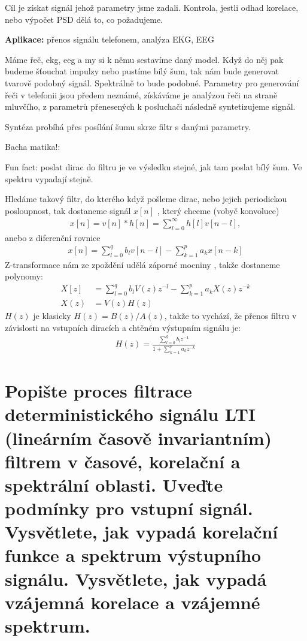 \documentclass[a4paper,12pt]{article}   %
\newcommand{\mt}[1]{$#1$}
\begin{document}
Cíl je získat signál jehož parametry jsme zadali. Kontrola, jestli odhad korelace, nebo výpočet PSD dělá to, co požadujeme.

\textbf{Aplikace:} přenos signálu telefonem, analýza EKG, EEG

Máme řeč, ekg, eeg a my si k němu sestavíme daný model. Když do něj pak budeme šťouchat impulzy nebo pustíme bílý šum, tak nám bude generovat tvarově podobný signál. Spektrálně to bude podobné. Parametry pro generování řeči v telefonii jsou předem neznámé, získáváme je analýzou řeči na straně mluvčího, z parametrů přenesených k posluchači následně syntetizujeme signál. 

Syntéza probíhá přes posílání šumu skrze filtr s danými parametry. 

Bacha matika!:

Fun fact: poslat dirac do filtru je ve výsledku stejné, jak tam poslat bílý šum. Ve spektru vypadají stejně.

Hledáme takový filtr, do kterého když pošleme dirac, nebo jejich periodickou posloupnost, tak dostaneme signál \mt{x[n]} , který chceme (vobyč konvoluce)
\begin{align*}
        x[n] = v[n]\ast h[n] = \sum_{l=0}^\infty h[l]v[n-l],
\end{align*}
anebo z diferenční rovnice
\begin{align*}
        x[n] = \sum^q_{l=0} b_l v[n-l] - \sum^p_{k=1}a_k x[n-k]
\end{align*}
Z-transformace nám ze zpoždění udělá záporné mocniny , takže dostaneme polynomy:
\begin{align*}
        X[z] &= \sum^q_{l=0} b_l V(z)z^{-l} - \sum^p_{k=1}a_k X(z)z^{-k}\\
        X(z) &= V(z)H(z)
\end{align*}
\mt{H(z)} je klasicky \mt{H(z) = B(z)/A(z)}, takže to vychází, že přenos filtru v závislosti na vstupních diracích a chtěném výstupním signálu je:
\begin{align*}
        H(z) = \frac{\sum^q_{l=0} b_l z^{-1}}{1 + \sum^p_{k=1} a_k z^{-k}}
\end{align*}


\section{Popište proces filtrace deterministického signálu LTI (lineárním časově invariantním) filtrem v časové, korelační a spektrální oblasti. Uveďte podmínky pro vstupní signál. Vysvětlete, jak vypadá korelační funkce a spektrum výstupního signálu. Vysvětlete, jak vypadá vzájemná korelace a vzájemné spektrum.}
\end{document}
